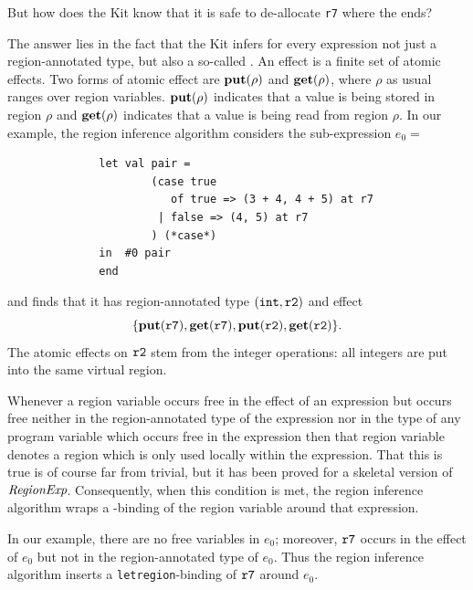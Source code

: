 \documentclass[12pt]{book}
\begin{document}
But how does the Kit know that it is safe to de-allocate {\tt r7}
where the  ends?

The answer lies in the fact that the Kit infers for every expression
not just a region-annotated type, but also a so-called . 
An effect is a finite set of 
atomic effects. Two forms of atomic
effect are $\mathop{\bf put}\nolimits(\rho)$ and $\mathop{\bf get}\nolimits(\rho)$, where $\rho$ as usual ranges
over region variables. $\mathop{\bf put}\nolimits(\rho)$ indicates that a value is being stored in
region $\rho$ and $\mathop{\bf get}\nolimits(\rho)$ indicates that a value is being read from region $\rho$.
In our example, the region inference algorithm considers the sub-expression $e_0 = $
\begin{verbatim}
              let val pair = 
                      (case true 
                         of true => (3 + 4, 4 + 5) at r7 
                       | false => (4, 5) at r7
                      ) (*case*) 
              in  #0 pair
              end  \end{verbatim}
and finds that it has region-annotated type $(\hbox{\tt int}, \hbox{\tt r2})$ and effect
$$\{\mathop{\bf put}\nolimits(\hbox{\tt r7}), \mathop{\bf get}\nolimits(\hbox{\tt r7}), \mathop{\bf put}\nolimits(\hbox{\tt r2}), \mathop{\bf get}\nolimits(\hbox{\tt r2})\}.$$
The atomic effects on $\hbox{\tt r2}$ stem from the integer operations: all integers
are put into the same virtual region.

Whenever a region variable occurs free in the effect of an expression but occurs
free neither in the region-annotated type of the expression nor in the type of any
program variable which occurs free in the expression then that region variable denotes
a region which is only used locally within the expression.  
That this is true is of course far from trivial, but it
has been proved for a skeletal version of $\hbox{\it RegionExp}$.  Consequently, 
when this condition is met, the region inference
algorithm wraps a -binding of the region variable
around that expression.

In our example, there are no free variables in $e_0$; moreover, $\hbox{\tt r7}$
occurs in the effect of $e_0$ but not in the region-annotated type of $e_0$. Thus
the region inference algorithm inserts a {\tt letregion}-binding of $\hbox{\tt r7}$
around $e_0$.
\end{document}
